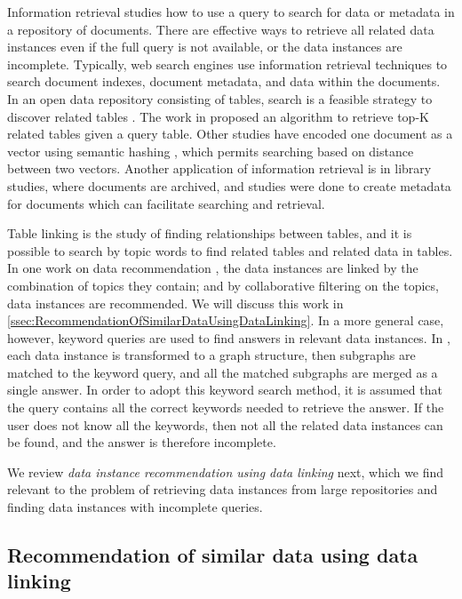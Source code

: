 Information retrieval studies how to use a query to search for data or metadata in a repository of documents. There are effective ways to retrieve all related data instances even if the full query is not available, or the data instances are incomplete. Typically, web search engines use information retrieval techniques to search document indexes, document metadata, and data within the documents. In an open data repository consisting of tables, search is a feasible strategy to discover related tables \cite{Miller2018MakingOD,10.14778/3229863.3240491}. The work in \cite{Nargesian2018Table} proposed an algorithm to retrieve top-K related tables given a query table. Other studies have encoded one document as a vector using semantic hashing \cite{Salakhutdinov2009Semantic}, which permits searching based on distance between two vectors. Another application of information retrieval is in library studies, where documents are archived, and studies were done to create metadata for documents \cite{Park2015Evaluation} which can facilitate searching and retrieval.

Table linking is the study of finding relationships between tables, and it is possible to search by topic words to find related tables and related data in tables. In one work on data recommendation \cite{conf/esws/EllefiBDT16}, the data instances are linked by the combination of topics they contain; and by collaborative filtering on the topics, data instances are recommended. We will discuss this work in \autoref{ssec:RecommendationOfSimilarDataUsingDataLinking}. In a more general case, however, keyword queries are used to find answers in relevant data instances. In \cite{DBLP:journals/pvldb/ChanialDGLNM18}, each data instance is transformed to a graph structure, then subgraphs are matched to the keyword query, and all the matched subgraphs are merged as a single answer. In order to adopt this keyword search method, it is assumed that the query contains all the correct keywords needed to retrieve the answer. If the user does not know all the keywords, then not all the related data instances can be found, and the answer is therefore incomplete.

We review \textit{data instance recommendation using data linking} next, which we find relevant to the problem of retrieving data instances from large repositories and finding data instances with incomplete queries.

\subsection{Recommendation of similar data using data linking}
\label{ssec:RecommendationOfSimilarDataUsingDataLinking}

